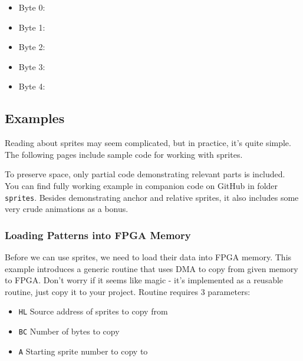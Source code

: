 \begin{itemize}[topsep=1pt,itemsep=1pt]
	\item Byte 0: 
	\item Byte 1: 
	\item Byte 2: 
	\item Byte 3: 
	\item Byte 4: 
\end{itemize}


\subsection{Examples}

Reading about sprites may seem complicated, but in practice, it's quite simple. The following pages include sample code for working with sprites.

To preserve space, only partial code demonstrating relevant parts is included. You can find fully working example in companion code on GitHub in folder {\tt sprites}. Besides demonstrating anchor and relative sprites, it also includes some very crude animations as a bonus.


\pagebreak
\subsubsection{Loading Patterns into FPGA Memory}

Before we can use sprites, we need to load their data into FPGA memory. This example introduces a generic routine that uses DMA to copy from given memory to FPGA. Don't worry if it seems like magic - it's implemented as a reusable routine, just copy it to your project. Routine requires 3 parameters:

\begin{itemize}[topsep=1pt,itemsep=1pt]
	\item {\tt HL} Source address of sprites to copy from
	\item {\tt BC} Number of bytes to copy
	\item {\tt A} Starting sprite number to copy to
\end{itemize}

